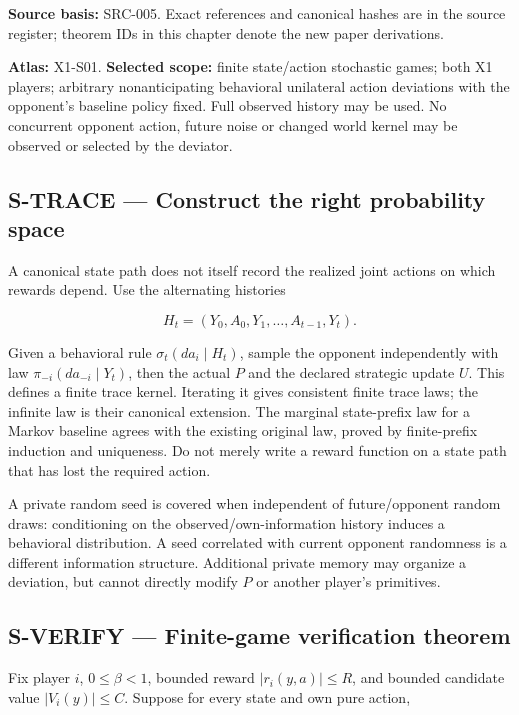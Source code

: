 \documentclass[
  11pt,
  a4paper,
]{article}
\begin{document}
\textbf{Source basis:} SRC-005. Exact references and canonical hashes
are in the source register; theorem IDs in this chapter denote the new
paper derivations.

\textbf{Atlas:} X1-S01. \textbf{Selected scope:} finite state/action
stochastic games; both X1 players; arbitrary nonanticipating behavioral
unilateral action deviations with the opponent's baseline policy fixed.
Full observed history may be used. No concurrent opponent action, future
noise or changed world kernel may be observed or selected by the
deviator.

\subsection{S-TRACE --- Construct the right probability
space}\label{s-trace-construct-the-right-probability-space}

A canonical state path does not itself record the realized joint actions
on which rewards depend. Use the alternating histories

\[H_t=(Y_0,A_0,Y_1,\ldots,A_{t-1},Y_t).\]

Given a behavioral rule \(\sigma_t(da_i\mid H_t)\), sample the opponent
independently with law \(\pi_{-i}(da_{-i}\mid Y_t)\), then the actual
\(P\) and the declared strategic update \(U\). This defines a finite
trace kernel. Iterating it gives consistent finite trace laws; the
infinite law is their canonical extension. The marginal state-prefix law
for a Markov baseline agrees with the existing original law, proved by
finite-prefix induction and uniqueness. Do not merely write a reward
function on a state path that has lost the required action.

A private random seed is covered when independent of future/opponent
random draws: conditioning on the observed/own-information history
induces a behavioral distribution. A seed correlated with current
opponent randomness is a different information structure. Additional
private memory may organize a deviation, but cannot directly modify
\(P\) or another player's primitives.

\subsection{S-VERIFY --- Finite-game verification
theorem}\label{s-verify-finite-game-verification-theorem}

Fix player \(i\), \(0\le\beta<1\), bounded reward \(|r_i(y,a)|\le R\),
and bounded candidate value \(|V_i(y)|\le C\). Suppose for every state
and own pure action,
\end{document}
